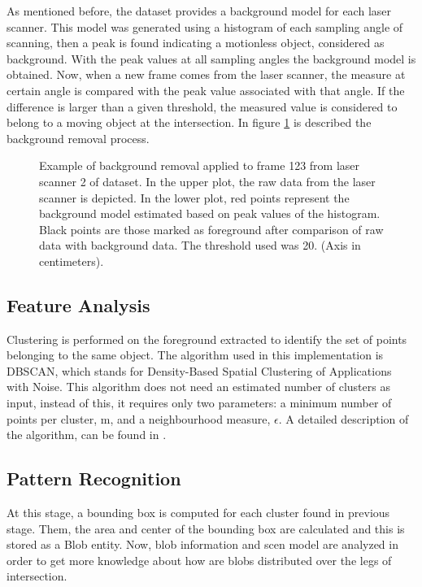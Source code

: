 \documentclass[10pt,twocolumn,letterpaper]{article}
\begin{document}
As mentioned before, the dataset provides a background model for each laser scanner. This model was generated using a histogram of each sampling angle of scanning, then a peak is found indicating a motionless object, considered as background. With the peak values at all sampling angles the background model is obtained. Now, when a new frame comes from the laser scanner, the measure at certain angle is compared with the peak value associated with that angle. If the difference is larger than a given threshold, the measured value is considered to belong to a moving object at the intersection. In figure \ref{bg_proc} is described the background removal process.



\begin{figure}[ht!]
\centering


\caption{Example of background removal applied to frame 123 from laser scanner 2 of dataset. In the upper plot, the raw data from the laser scanner is depicted. In the lower plot, red points represent the background model estimated based on peak values of the histogram. Black points are those marked as foreground after comparison of raw data with background data. The threshold used was 20. (Axis in centimeters).}
\label{bg_proc}
\end{figure}


\subsection{Feature Analysis}

Clustering is performed on the foreground extracted to identify the set of points belonging to the same object. The algorithm used in this implementation is DBSCAN, which stands for Density-Based Spatial Clustering of Applications with Noise. This algorithm does not need an estimated number of clusters as input, instead of this, it requires only two parameters: a minimum number of points per cluster, m, and a neighbourhood measure, $\epsilon$. A detailed description of the algorithm, can be found in \cite{Ester96}.

\subsection{Pattern Recognition}

At this stage, a bounding box is computed for each cluster found in previous stage. Them, the area and center of the bounding box are calculated and this is stored as a Blob entity. Now, blob information and scen model are analyzed in order to get more knowledge about how are blobs distributed over the legs of intersection.
\end{document}
